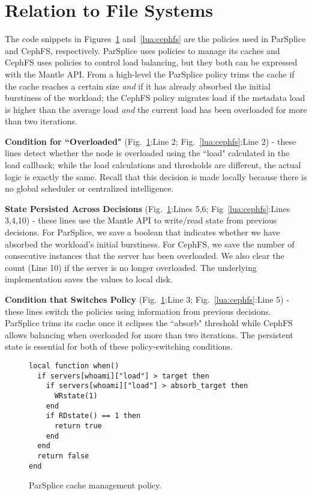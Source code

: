 \section{Relation to File Systems}

The code snippets in Figures~\ref{lua:parsplice} and~\ref{lua:cephfs} are the
policies used in ParSplice and CephFS, respectively.  ParSplice uses policies
to manage its caches and CephFS uses policies to control load balancing, but
they both can be expressed with the Mantle API.  From a high-level the
ParSplice policy trims the cache if the cache reaches a certain size {\it and}
if it has already absorbed the initial burstiness of the workload; the CephFS
policy migrates load if the metadata load is higher than the average load {\it
and} the current load has been overloaded for more than two iterations.

\textbf{Condition for ``Overloaded"} (Fig.~\ref{lua:parsplice}:Line 2;
Fig.~\ref{lua:cephfs}:Line 2) - these lines detect whether the node is
overloaded using the ``load" calculated in the load callback; while the load
calculations and thresholds are different, the actual logic is exactly the
same.  Recall that this decision is made locally because there is no global
scheduler or centralized intelligence. 

\textbf{State Persisted Across Decisions} (Fig.~\ref{lua:parsplice}:Lines 5,6;
Fig~\ref{lua:cephfs}:Lines 3,4,10) - these lines use the Mantle API to
write/read state from previous decisions.  For ParSplice, we save a boolean
that indicates whether we have absorbed the workload's initial burstiness. For
CephFS, we save the number of consecutive instances that the server has been
overloaded. We also clear the count (Line 10) if the server is no longer
overloaded. The underlying implementation saves the values to local disk.

\textbf{Condition that Switches Policy} (Fig.~\ref{lua:parsplice}:Line 3;
Fig.~\ref{lua:cephfs}:Line 5) - these lines switch the policies using
information from previous decisions. ParSplice trims its cache once it eclipses
the ``absorb" threshold while CephFS allows balancing when overloaded for more
than two iterations. The persistent state is essential for both of these
policy-switching conditions.

\begin{figure}[tb]
\begin{verbatim}
local function when()
  if servers[whoami]["load"] > target then
    if servers[whoami]["load"] > absorb_target then
      WRstate(1)
    end
    if RDstate() == 1 then
      return true
    end
  end
  return false
end
\end{verbatim}
\caption{ParSplice cache management policy.\label{lua:parsplice}}
\end{figure}

